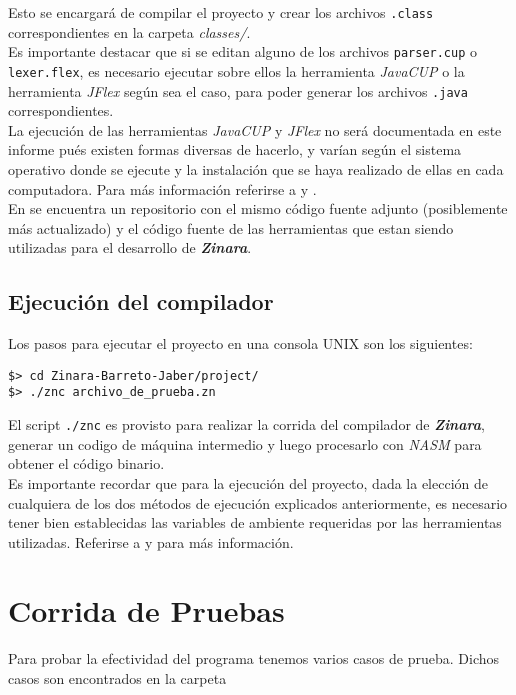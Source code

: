 \documentclass[12pt, spanish]{report}
\begin{document}
Esto se encargar\'a de compilar el proyecto y crear los archivos
\texttt{.class} correspondientes en la carpeta \emph{classes/}.\\

Es importante destacar que si se editan alguno de los archivos
\texttt{parser.cup} o \texttt{lexer.flex}, es necesario ejecutar sobre
ellos la herramienta \emph{JavaCUP} o la herramienta \emph{JFlex}
según sea el caso, para poder generar los archivos \texttt{.java}
correspondientes.\\

La ejecuci\'on de las herramientas \emph{JavaCUP} y \emph{JFlex} no ser\'a
documentada en este informe pu\'es existen formas diversas de hacerlo, y
var\'ian seg\'un el sistema operativo donde se ejecute y la instalaci\'on
que se haya realizado de ellas en cada computadora. Para m\'as
informaci\'on referirse a \cite{javacup} y \cite{jflex}.\\

En \cite{github} se encuentra un repositorio con el mismo c\'odigo
fuente adjunto (posiblemente m\'as actualizado) y el c\'odigo fuente de
las herramientas que estan siendo utilizadas para el desarrollo de
\emph{\textbf{Zinara}}.

\section{Ejecuci\'on del compilador}
\label{sec:zejecucion}
Los pasos para ejecutar el proyecto en una consola UNIX son los
siguientes:

\begin{verbatim}
$> cd Zinara-Barreto-Jaber/project/
$> ./znc archivo_de_prueba.zn
\end{verbatim}

El script \texttt{./znc} es provisto para realizar la corrida del
compilador de \emph{\textbf{Zinara}}, generar un codigo de máquina
intermedio y luego procesarlo con \emph{NASM} para obtener el código
binario.\\

Es importante recordar que para la ejecuci\'on del proyecto, dada la
elecci\'on de cualquiera de los dos m\'etodos de ejecuci\'on explicados
anteriormente, es necesario tener bien establecidas las variables de
ambiente requeridas por las herramientas utilizadas. Referirse a
\cite{javacup} y \cite{jflex} para m\'as informaci\'on.

\chapter{Corrida de Pruebas}
\label{sec:pruebas}
Para probar la efectividad del programa tenemos varios casos de
prueba. Dichos casos son encontrados en la carpeta
\end{document}
